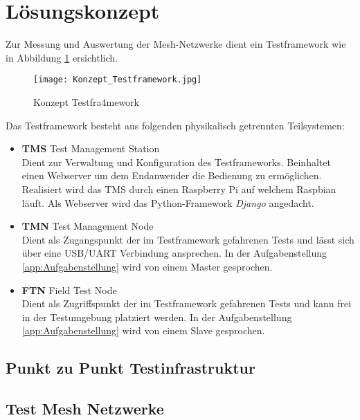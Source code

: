\clearpage
\section{Lösungskonzept}\label{sec:Loesungskonzept}

Zur Messung und Auswertung der Mesh-Netzwerke dient ein Testframework wie in Abbildung \ref{fig:KonzeptTestframework} ersichtlich.

\begin{figure}[H]
	\centering
	\texttt{[image: Konzept\_Testframework.jpg]}
	\caption{Konzept Testfra4mework}\label{fig:KonzeptTestframework}
\end{figure}


Das Testframework besteht aus folgenden physikalisch getrennten Teilsystemen:

\begin{itemize}
	\item \textbf{TMS} Test Management Station \\ 
	Dient zur Verwaltung und Konfiguration des Testframeworks. Beinhaltet einen Webserver um dem Endanwender die Bedienung zu ermöglichen. Realisiert wird das TMS durch einen Raspberry Pi auf welchem Raspbian läuft. Als Webserver wird das Python-Framework \textit{Django} angedacht.
	\item \textbf{TMN} Test Management Node \\ 
	Dient als Zugangspunkt der im Testframework gefahrenen Tests und lässt sich über eine USB/UART Verbindung ansprechen. In der Aufgabenstellung \ref{app:Aufgabenstellung} wird von einem Master gesprochen. 
	\item \textbf{FTN} Field Test Node \\ 
	Dient als Zugriffspunkt der im Testframework gefahrenen Tests und kann frei in der Testumgebung platziert werden. In der Aufgabenstellung  \ref{app:Aufgabenstellung} wird von einem Slave gesprochen. 
\end{itemize}



\subsection{Punkt zu Punkt Testinfrastruktur}\label{subsec:PunktzuPunktTestinfrastruktur}


\subsection{Test Mesh Netzwerke}\label{subsec:TestMeshNetzwerke}

